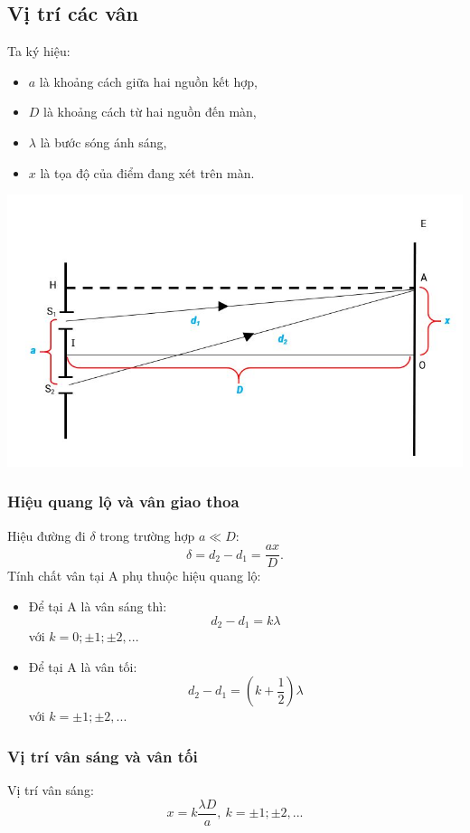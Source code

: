 \subsection{Vị trí các vân}
Ta ký hiệu: 
\begin{itemize}
	\item $a$ là khoảng cách giữa hai nguồn kết hợp,
	\item $D$ là khoảng cách từ hai nguồn đến màn,
	\item $\lambda$ là bước sóng ánh sáng,
	\item $x$ là tọa độ của điểm đang xét trên màn.
\end{itemize}
\begin{center}
	\includegraphics[scale=0.7]{../figs/VN12-PH-33-L-020-1-1.JPG}
\end{center}

\subsubsection{Hiệu quang lộ và vân giao thoa}
Hiệu đường đi $\delta$ trong trường hợp $a\ll D$:
\begin{equation}
	\delta = d_2-d_1=\dfrac{ax}{D}.  
\end{equation}
Tính chất vân tại A phụ thuộc hiệu quang lộ:
\begin{itemize}
	\item Để tại A là vân sáng thì: $$d_2-d_1=k\lambda$$ với $k=0; \pm 1; \pm 2,...$
	\item Để tại A là vân tối: $$d_2-d_1=\left(k+\dfrac{1}{2}\right) \lambda$$ với $k= \pm 1; \pm 2,...$
\end{itemize}
\subsubsection{Vị trí vân sáng và vân tối}
Vị trí vân sáng:
\begin{equation}
	x=k\dfrac{\lambda D}{a},\ k=\pm 1; \pm 2,...
\end{equation}

